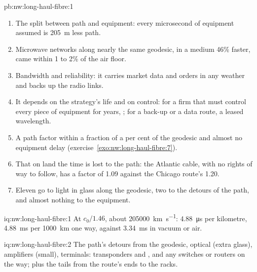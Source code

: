 \begin{solution}{pb:nw:long-haul-fibre:1}
\begin{enumerate}[resume]
  save \qty{2.08}{\milli\second} one way, \qty{4.16}{\milli\second} round trip.
\item The split between path and equipment: every microsecond of equipment assumed is \qty{205}{\metre} less path.
\item Microwave networks along nearly the same geodesic, in a medium 46\% faster, came within 1 to 2\% of the air floor.
\item Bandwidth and reliability: it carries market data and orders in any weather and backs up the radio links.
\item It depends on the strategy's life and on control: for a firm that must control every piece of equipment for years, ; for a
  back-up or a data route, a leased wavelength.
\item A path factor within a fraction of a per cent of the geodesic and almost no equipment delay (exercise~\ref{exo:nw:long-haul-fibre:7}).
\item That on land the time is lost to the path: the Atlantic cable, with no rights of way to follow, has a factor of 1.09 against the Chicago
  route's 1.20.
\item Eleven go to light in glass along the geodesic, two to the detours of the path, and almost nothing to the equipment.
\end{enumerate}
\end{solution}

\begin{solution}{iq:nw:long-haul-fibre:1}
At $c_0/1.46$, about \qty{205000}{\kilo\metre\per\second}: \qty{4.88}{\micro\second} per kilometre, \qty{4.88}{\milli\second} per
\qty{1000}{\kilo\metre} one way, against \qty{3.34}{\milli\second} in vacuum or air.
\end{solution}

\begin{solution}{iq:nw:long-haul-fibre:2}
The path's detours from the geodesic, optical  (extra glass), amplifiers (small), terminals: transponders and , and any switches or routers on the way; plus the tails from the route's ends to the racks.
\end{solution}

